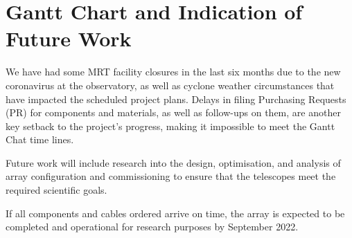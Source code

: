 {\section{Gantt Chart and Indication of Future Work}
 
 
We have had some MRT facility closures in the last six months due to the new coronavirus at the observatory, as well as cyclone weather circumstances that have impacted the scheduled project plans. Delays in filing Purchasing Requests (PR) for components and materials, as well as follow-ups on them, are another key setback to the project's progress, making it impossible to meet the Gantt Chat time lines.
  
Future work will include research into the design, optimisation, and analysis of array configuration and commissioning to ensure that the telescopes meet the required scientific goals.

If all components and cables ordered arrive on time, the array is expected to be completed and operational for research purposes by September 2022.
 
 
 }